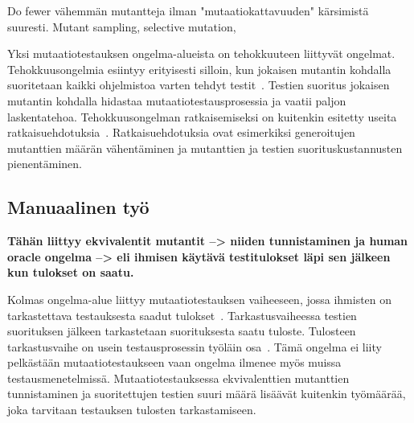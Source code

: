 \documentclass[finnish, grading]{tktltiki2}
\theoremstyle{definition}
\theoremstyle{remark}
\begin{document}
Do fewer vähemmän mutantteja ilman "mutaatiokattavuuden" kärsimistä suuresti. Mutant sampling, selective mutation, 

Yksi mutaatiotestauksen ongelma-alueista on tehokkuuteen liittyvät ongelmat. Tehokkuusongelmia esiintyy erityisesti silloin, kun jokaisen mutantin kohdalla suoritetaan kaikki ohjelmistoa varten tehdyt testit~\cite[s. 652]{Jia:Harman:2011}. Testien suoritus jokaisen mutantin kohdalla hidastaa mutaatiotestausprosessia ja vaatii paljon laskentatehoa. Tehokkuusongelman ratkaisemiseksi on kuitenkin esitetty useita ratkaisuehdotuksia~\cite[s. 653]{Jia:Harman:2011}. Ratkaisuehdotuksia ovat esimerkiksi generoitujen mutanttien määrän vähentäminen ja mutanttien ja testien suorituskustannusten pienentäminen.

\subsection{Manuaalinen työ}

\textbf{Tähän liittyy ekvivalentit mutantit --> niiden tunnistaminen ja human oracle ongelma --> eli ihmisen käytävä testitulokset läpi sen jälkeen kun tulokset on saatu.}

Kolmas ongelma-alue liittyy mutaatiotestauksen vaiheeseen, jossa ihmisten on tarkastettava testauksesta saadut tulokset~\cite[s. 652]{Jia:Harman:2011}. Tarkastusvaiheessa testien suorituksen jälkeen tarkastetaan suorituksesta saatu tuloste. Tulosteen tarkastusvaihe on usein testausprosessin työläin osa~\cite[s. 653]{Jia:Harman:2011}. Tämä ongelma ei liity pelkästään mutaatiotestaukseen vaan ongelma ilmenee myös muissa testausmenetelmissä. Mutaatiotestauksessa ekvivalenttien mutanttien tunnistaminen ja suoritettujen testien suuri määrä lisäävät kuitenkin työmäärää, joka tarvitaan testauksen tulosten tarkastamiseen.





\end{document}
